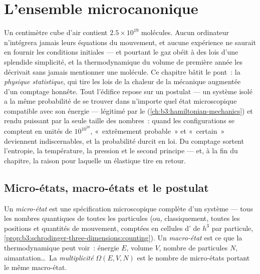 \chapter{L'ensemble microcanonique}\label{ch:b3:microcanonical-ensemble}

Un centimètre cube d'air contient $2.5\times10^{19}$ molécules. Aucun
ordinateur n'intégrera jamais leurs équations du mouvement, et aucune
expérience ne saurait en fournir les conditions initiales --- et
pourtant le gaz obéit à des lois d'une splendide simplicité, et la
thermodynamique du volume de première année les décrivait sans jamais
mentionner une molécule. Ce chapitre bâtit le pont~: la \emph{physique
statistique}, qui tire les lois de la chaleur de la mécanique augmentée
d'un comptage honnête. Tout l'édifice repose sur un postulat --- un
système isolé a la même probabilité de se trouver dans n'importe quel
état microscopique compatible avec son énergie --- légitimé par le
 (\cref{ch:b3:hamiltonian-mechanics}) et rendu
puissant par la seule taille des nombres~: quand les configurations se
comptent en unités de $10^{10^{20}}$, «~extrêmement probable~» et
«~certain~» deviennent indiscernables, et la probabilité durcit en loi.
Du comptage sortent l'entropie, la température, la pression et le
second principe --- et, à la fin du chapitre, la raison pour laquelle
un élastique tire en retour.

\section{Micro-états, macro-états et le postulat}

\begin{definition}\label{def:b3:microcanonical-ensemble:states}
Un \emph{micro-état} est une spécification microscopique complète d'un
système --- tous les nombres quantiques de toutes les particules (ou,
classiquement, toutes les positions et quantités de mouvement,
comptées en cellules d' de $h^3$ par particule,
\cref{prop:b3:schrodinger-three-dimensions:counting}). Un
\emph{macro-état} est ce que la thermodynamique peut voir~: énergie
$E$, volume $V$, nombre de particules $N$, aimantation\dots\ La
\emph{multiplicité} $\Omega(E, V, N)$ est le nombre de micro-états
portant le même macro-état.
\end{definition}

